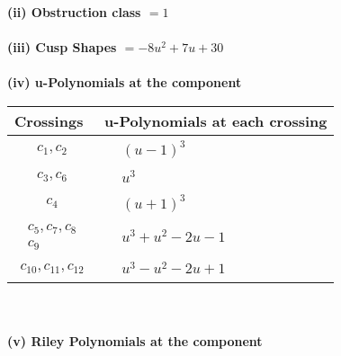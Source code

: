 \documentclass[1p]{elsarticle_modified}
\theoremstyle{definition}
\begin{document}
\flushleft \textbf{(ii) Obstruction class $= 1$}\\~\\
\flushleft \textbf{(iii) Cusp Shapes $= -8 u^2+7 u+30$}\\~\\
\newpage\renewcommand{\arraystretch}{1}
\flushleft \textbf{(iv) u-Polynomials at the component}\newline \\
\begin{tabular}{m{50pt}|m{274pt}}
Crossings & \hspace{64pt}u-Polynomials at each crossing \\
\hline $$\begin{aligned}c_{1},c_{2}\end{aligned}$$&$\begin{aligned}
&(u-1)^3
\end{aligned}$\\
\hline $$\begin{aligned}c_{3},c_{6}\end{aligned}$$&$\begin{aligned}
&u^3
\end{aligned}$\\
\hline $$\begin{aligned}c_{4}\end{aligned}$$&$\begin{aligned}
&(u+1)^3
\end{aligned}$\\
\hline $$\begin{aligned}c_{5},c_{7},c_{8}\\c_{9}\end{aligned}$$&$\begin{aligned}
&u^3+u^2-2 u-1
\end{aligned}$\\
\hline $$\begin{aligned}c_{10},c_{11},c_{12}\end{aligned}$$&$\begin{aligned}
&u^3- u^2-2 u+1
\end{aligned}$\\
\hline
\end{tabular}\\~\\
\newpage\renewcommand{\arraystretch}{1}
\flushleft \textbf{(v) Riley Polynomials at the component}\newline \\
\end{document}
